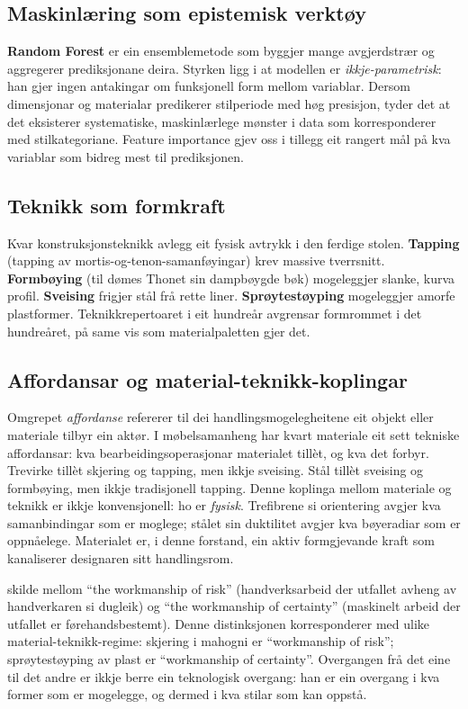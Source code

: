 \documentclass[10pt, a4paper, twocolumn]{article}
\begin{document}
\subsection{Maskinlæring som epistemisk verktøy}

\textbf{Random Forest} \citep{breiman2001} er ein ensemblemetode som byggjer mange avgjerdstrær og aggregerer prediksjonane deira. Styrken ligg i at modellen er \emph{ikkje-parametrisk}: han gjer ingen antakingar om funksjonell form mellom variablar. Dersom dimensjonar og materialar predikerer stilperiode med høg presisjon, tyder det at det eksisterer systematiske, maskinlærlege mønster i data som korresponderer med stilkategoriane. Feature importance gjev oss i tillegg eit rangert mål på kva variablar som bidreg mest til prediksjonen.

\subsection{Teknikk som formkraft}

Kvar konstruksjonsteknikk avlegg eit fysisk avtrykk i den ferdige stolen. \textbf{Tapping} (tapping av mortis-og-tenon-samanføyingar) krev massive tverrsnitt. \textbf{Formbøying} (til dømes Thonet sin dampbøygde bøk) mogeleggjer slanke, kurva profil. \textbf{Sveising} frigjer stål frå rette liner. \textbf{Sprøytestøyping} mogeleggjer amorfe plastformer. Teknikkrepertoaret i eit hundreår avgrensar formrommet i det hundreåret, på same vis som materialpaletten gjer det.

\subsection{Affordansar og material-teknikk-koplingar}

Omgrepet \emph{affordanse} \citep{gibson1979} refererer til dei handlingsmogelegheitene eit objekt eller materiale tilbyr ein aktør. I møbelsamanheng har kvart materiale eit sett tekniske affordansar: kva bearbeidingsoperasjonar materialet tillèt, og kva det forbyr. Trevirke tillèt skjering og tapping, men ikkje sveising. Stål tillèt sveising og formbøying, men ikkje tradisjonell tapping. Denne koplinga mellom materiale og teknikk er ikkje konvensjonell: ho er \emph{fysisk}. Trefibrene si orientering avgjer kva samanbindingar som er moglege; stålet sin duktilitet avgjer kva bøyeradiar som er oppnåelege. Materialet er, i denne forstand, ein aktiv formgjevande kraft som kanaliserer designaren sitt handlingsrom.

\citet{pye1968} skilde mellom ``the workmanship of risk'' (handverksarbeid der utfallet avheng av handverkaren si dugleik) og ``the workmanship of certainty'' (maskinelt arbeid der utfallet er førehandsbestemt). Denne distinksjonen korresponderer med ulike material-teknikk-regime: skjering i mahogni er ``workmanship of risk''; sprøytestøyping av plast er ``workmanship of certainty''. Overgangen frå det eine til det andre er ikkje berre ein teknologisk overgang: han er ein overgang i kva former som er mogelegge, og dermed i kva stilar som kan oppstå.
\end{document}
